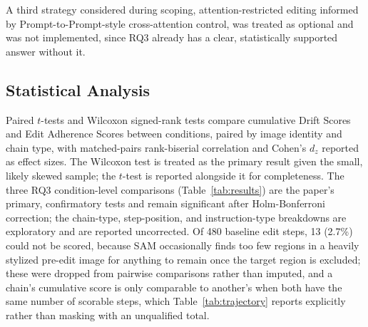 A third strategy considered during scoping, attention-restricted editing informed by Prompt-to-Prompt-style cross-attention control, was treated as optional and was not implemented, since RQ3 already has a clear, statistically supported answer without it.

\subsection{Statistical Analysis}
Paired $t$-tests and Wilcoxon signed-rank tests compare cumulative Drift Scores and Edit Adherence Scores between conditions, paired by image identity and chain type, with matched-pairs rank-biserial correlation and Cohen's $d_z$ reported as effect sizes. The Wilcoxon test is treated as the primary result given the small, likely skewed sample; the $t$-test is reported alongside it for completeness. The three RQ3 condition-level comparisons (Table~\ref{tab:results}) are the paper's primary, confirmatory tests and remain significant after Holm-Bonferroni correction; the chain-type, step-position, and instruction-type breakdowns are exploratory and are reported uncorrected. Of 480 baseline edit steps, 13 (2.7\%) could not be scored, because SAM occasionally finds too few regions in a heavily stylized pre-edit image for anything to remain once the target region is excluded; these were dropped from pairwise comparisons rather than imputed, and a chain's cumulative score is only comparable to another's when both have the same number of scorable steps, which Table~\ref{tab:trajectory} reports explicitly rather than masking with an unqualified total.
